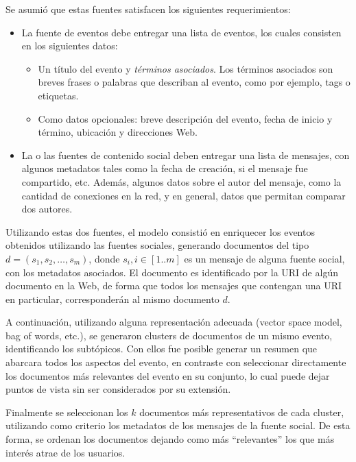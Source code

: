    Se asumió que estas fuentes satisfacen los siguientes
   requerimientos:

\begin{itemize}
\item La fuente de eventos debe entregar una lista de eventos, los
     cuales consisten en los siguientes datos:

\begin{itemize}
\item Un título del evento y \emph{términos asociados}. Los términos
       asociados son breves frases o palabras que describan al
       evento, como por ejemplo, tags o etiquetas.
\item Como datos opcionales: breve descripción del evento, fecha de
       inicio y término, ubicación y direcciones Web.
\end{itemize}

\item La o las fuentes de contenido social deben entregar una lista de
     mensajes, con algunos metadatos tales como la fecha de creación,
     si el mensaje fue compartido, etc. Además, algunos datos sobre el
     autor del mensaje, como la cantidad de conexiones en la red, y
     en general, datos que permitan comparar dos autores.
\end{itemize}
   Utilizando estas dos fuentes, el modelo consistió en enriquecer los
   eventos obtenidos utilizando las fuentes sociales, generando
   documentos del tipo $d = (s_1, s_2, \ldots, s_m)$, donde
   $s_i, i \in [1..m]$ es un mensaje de alguna fuente social, con los
   metadatos asociados. El documento es identificado por la URI de
   algún documento en la Web, de forma que todos los mensajes que
   contengan una URI en particular, corresponderán al mismo documento
   $d$.

   A continuación, utilizando alguna representación adecuada (vector
   space model, bag of words, etc.), se generaron clusters de documentos
   de un mismo evento, identificando los subtópicos. Con ellos fue
   posible generar un resumen que abarcara todos los aspectos del
   evento, en contraste con seleccionar directamente los documentos
   más relevantes del evento en su conjunto, lo cual puede dejar
   puntos de vista sin ser considerados por su extensión.

   Finalmente se seleccionan los $k$ documentos más representativos de
   cada cluster, utilizando como criterio los metadatos de los
   mensajes de la fuente social. De esta forma, se ordenan los
   documentos dejando como más ``relevantes'' los que más interés atrae
   de los usuarios.

